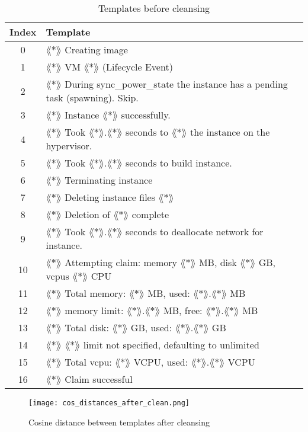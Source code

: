 \begin{table}[ht]
\begin{small}
\begin{tabular}{ c l } 
\toprule
Index & Template \\
\midrule
0 & $\lang*\rang$ Creating image\\
1 & $\lang*\rang$ VM $\lang*\rang$ (Lifecycle Event)\\
2 & $\lang*\rang$ During sync\_power\_state the instance has a pending task (spawning). Skip.\\
3 & $\lang*\rang$ Instance $\lang*\rang$ successfully.\\
4 & $\lang*\rang$ Took $\lang*\rang$.$\lang*\rang$ seconds to $\lang*\rang$ the instance on the hypervisor.\\
5 & $\lang*\rang$ Took $\lang*\rang$.$\lang*\rang$ seconds to build instance.\\
6 & $\lang*\rang$ Terminating instance\\
7 & $\lang*\rang$ Deleting instance files $\lang*\rang$\\
8 & $\lang*\rang$ Deletion of $\lang*\rang$ complete\\
9 & $\lang*\rang$ Took $\lang*\rang$.$\lang*\rang$ seconds to deallocate network for instance.\\
10 & $\lang*\rang$ Attempting claim: memory $\lang*\rang$ MB, disk $\lang*\rang$ GB, vcpus $\lang*\rang$ CPU\\
11 & $\lang*\rang$ Total memory: $\lang*\rang$ MB, used: $\lang*\rang$.$\lang*\rang$ MB\\
12 & $\lang*\rang$ memory limit: $\lang*\rang$.$\lang*\rang$ MB, free: $\lang*\rang$.$\lang*\rang$ MB\\
13 & $\lang*\rang$ Total disk: $\lang*\rang$ GB, used: $\lang*\rang$.$\lang*\rang$ GB\\
14 & $\lang*\rang$ $\lang*\rang$ limit not specified, defaulting to unlimited\\
15 & $\lang*\rang$ Total vcpu: $\lang*\rang$ VCPU, used: $\lang*\rang$.$\lang*\rang$ VCPU\\
16 & $\lang*\rang$ Claim successful\\
\bottomrule
\end{tabular}
\caption{Templates before cleansing}
\label{tab:templates_before_cleansing}
\end{small}
\end{table}

\begin{figure}[h]
  \centering
  \texttt{[image: cos\_distances\_after\_clean.png]}\\
  \caption{Cosine distance between templates after cleansing}
  \label{fig:cos_distance_after_cleansing}
\end{figure}

